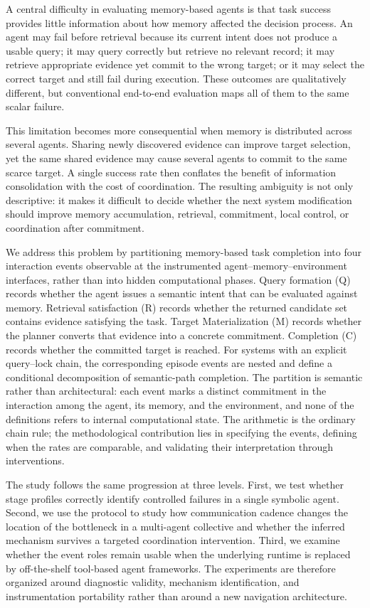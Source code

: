 \documentclass{article}
\begin{document}
A central difficulty in evaluating memory-based agents is that task success provides little information about how memory affected the decision process. An agent may fail before retrieval because its current intent does not produce a usable query; it may query correctly but retrieve no relevant record; it may retrieve appropriate evidence yet commit to the wrong target; or it may select the correct target and still fail during execution. These outcomes are qualitatively different, but conventional end-to-end evaluation maps all of them to the same scalar failure.

This limitation becomes more consequential when memory is distributed across several agents. Sharing newly discovered evidence can improve target selection, yet the same shared evidence may cause several agents to commit to the same scarce target. A single success rate then conflates the benefit of information consolidation with the cost of coordination. The resulting ambiguity is not only descriptive: it makes it difficult to decide whether the next system modification should improve memory accumulation, retrieval, commitment, local control, or coordination after commitment.

We address this problem by partitioning memory-based task completion into four interaction events observable at the instrumented agent--memory--environment interfaces, rather than into hidden computational phases. Query formation (Q) records whether the agent issues a semantic intent that can be evaluated against memory. Retrieval satisfaction (R) records whether the returned candidate set contains evidence satisfying the task. Target Materialization (M) records whether the planner converts that evidence into a concrete commitment. Completion (C) records whether the committed target is reached. For systems with an explicit query--lock chain, the corresponding episode events are nested and define a conditional decomposition of semantic-path completion. The partition is semantic rather than architectural: each event marks a distinct commitment in the interaction among the agent, its memory, and the environment, and none of the definitions refers to internal computational state. The arithmetic is the ordinary chain rule; the methodological contribution lies in specifying the events, defining when the rates are comparable, and validating their interpretation through interventions.

The study follows the same progression at three levels. First, we test whether stage profiles correctly identify controlled failures in a single symbolic agent. Second, we use the protocol to study how communication cadence changes the location of the bottleneck in a multi-agent collective and whether the inferred mechanism survives a targeted coordination intervention. Third, we examine whether the event roles remain usable when the underlying runtime is replaced by off-the-shelf tool-based agent frameworks. The experiments are therefore organized around diagnostic validity, mechanism identification, and instrumentation portability rather than around a new navigation architecture.
\end{document}
